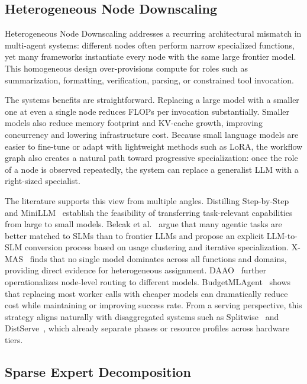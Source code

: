 \subsection{Heterogeneous Node Downscaling}

Heterogeneous Node Downscaling addresses a recurring architectural mismatch in multi-agent systems: different nodes often perform narrow specialized functions, yet many frameworks instantiate every node with the same large frontier model. This homogeneous design over-provisions compute for roles such as summarization, formatting, verification, parsing, or constrained tool invocation.

The systems benefits are straightforward. Replacing a large model with a smaller one at even a single node reduces FLOPs per invocation substantially. Smaller models also reduce memory footprint and KV-cache growth, improving concurrency and lowering infrastructure cost. Because small language models are easier to fine-tune or adapt with lightweight methods such as LoRA, the workflow graph also creates a natural path toward progressive specialization: once the role of a node is observed repeatedly, the system can replace a generalist LLM with a right-sized specialist.

The literature supports this view from multiple angles. Distilling Step-by-Step~\citep{hsieh2023distilling} and MiniLLM~\citep{gu2023minillm} establish the feasibility of transferring task-relevant capabilities from large to small models. Belcak et al.~\citep{belcak2025slm} argue that many agentic tasks are better matched to SLMs than to frontier LLMs and propose an explicit LLM-to-SLM conversion process based on usage clustering and iterative specialization. X-MAS~\citep{ye2025xmas} finds that no single model dominates across all functions and domains, providing direct evidence for heterogeneous assignment. DAAO~\citep{daao2025} further operationalizes node-level routing to different models. BudgetMLAgent~\citep{budgetmlagent2024} shows that replacing most worker calls with cheaper models can dramatically reduce cost while maintaining or improving success rate. From a serving perspective, this strategy aligns naturally with disaggregated systems such as Splitwise~\citep{patel2024splitwise} and DistServe~\citep{zhong2024distserve}, which already separate phases or resource profiles across hardware tiers.

\subsection{Sparse Expert Decomposition}

